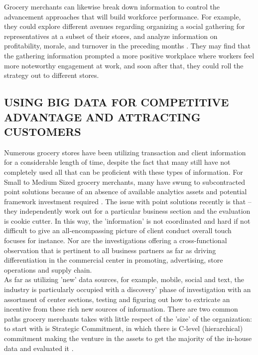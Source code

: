 \documentclass[sigconf]{acmart}
\begin{document}
Grocery merchants can likewise break down information to control the advancement approaches that will build workforce performance. For example, they could explore different avenues regarding organizing a social gathering for representatives at a subset of their stores, and analyze information on profitability, morale, and turnover in the preceding months \cite{10}. They may find that the gathering information prompted a more positive workplace where workers feel more noteworthy engagement at work, and soon after that, they could roll the strategy out to different stores. 


\subsection{USING BIG DATA FOR COMPETITIVE ADVANTAGE AND ATTRACTING CUSTOMERS}

Numerous grocery stores have been utilizing transaction and client information for a considerable length of time, despite the fact that many still have not completely used all that can be proficient with these types of information. For Small to Medium Sized grocery merchants, many have swung to subcontracted point solutions because of an absence of available analytics assets and potential framework investment required \cite{12, 13}. The issue with point solutions recently is that – they independently work out for a particular business section and the evaluation is cookie cutter. In this way, the 'information' is not coordinated and hard if not difficult to give an all-encompassing picture of client conduct overall touch focuses for instance.  Nor are the investigations offering a cross-functional observation that is pertinent to all business partners as far as driving differentiation in the commercial center in promoting, advertising, store operations and supply chain. \\

As far as utilizing 'new' data sources, for example, mobile, social and text, the industry is particularly occupied with a discovery' phase of investigation with an assortment of center sections, testing and figuring out how to extricate an incentive from these rich new sources of information. There are two common paths grocery merchants takes with little respect of the 'size' of the organization: to start with is Strategic Commitment, in which there is C-level (hierarchical) commitment making the venture in the assets to get the majority of the in-house data and evaluated it \cite{10}.\\
\end{document}
